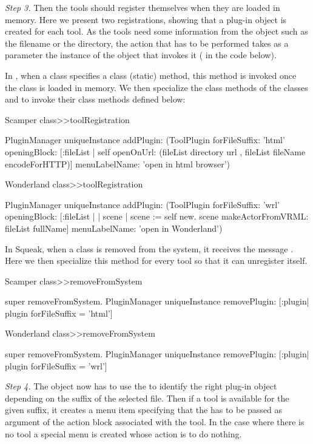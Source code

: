 \documentclass[a4paper,10pt,twoside]{book}
\begin{document}
\noindent
\emph{Step 3.}
Then the tools should register themselves when they are loaded in memory. Here we present two registrations, showing that a plug-in object is created for each tool. As the tools need some information from the  object such as the filename or the directory, the action that has to be performed takes as a parameter the instance of the  object that invokes it (\lct{[:fileList |...]} in the code below).

In , when a class specifies a class (static)  method, this method is invoked once the class is loaded in memory. We then specialize the class methods  of the classes  and  to invoke their class methods  defined below:

\begin{code}
Scamper class>>toolRegistration

	PluginManager uniqueInstance 
		addPlugin: 
		(ToolPlugin 
				forFileSuffix: 'html' 
				openingBlock: 
					[:fileList |
					self openOnUrl: 
						(fileList directory url , 
							fileList fileName encodeForHTTP)]
				menuLabelName: 'open in html browser')	

Wonderland class>>toolRegistration

	PluginManager uniqueInstance 
		addPlugin: 
		(ToolPlugin 
				forFileSuffix: 'wrl' 
				openingBlock: 
					[:fileList | 
					| scene |
					scene := self new.
					scene makeActorFromVRML: fileList fullName]
				menuLabelName: 'open in Wonderland')
\end{code}

In Squeak, when a class is removed from the system, it receives the message . Here we then specialize this method for every tool so that it can unregister itself.

\begin{code}
Scamper class>>removeFromSystem
	
	super removeFromSystem.
	PluginManager uniqueInstance 
		removePlugin: [:plugin| plugin forFileSuffix = 'html']

Wonderland class>>removeFromSystem
	
	super removeFromSystem.
	PluginManager uniqueInstance 
		removePlugin: [:plugin| plugin forFileSuffix = 'wrl']
\end{code}

\noindent
\emph{Step 4.}
The  object now has to use the  to identify the right plug-in object depending on the suffix of the selected file. Then if a tool is available for the given suffix, it creates a menu item specifying that the  has to be passed as argument of the action block associated with the tool. In the case where there is no tool a special menu is created whose action is to do nothing. 
\end{document}
